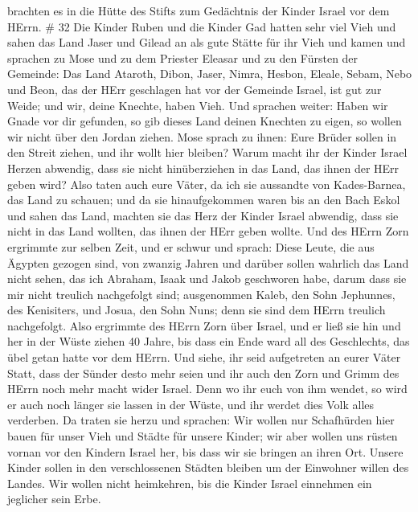 brachten es in die Hütte des Stifts zum Gedächtnis der Kinder Israel vor
dem HErrn. \# 32  Die Kinder Ruben und die Kinder Gad hatten
sehr viel Vieh und sahen das Land Jaser und Gilead an als gute Stätte
für ihr Vieh  und kamen und sprachen zu Mose und zu dem
Priester Eleasar und zu den Fürsten der Gemeinde:  Das Land
Ataroth, Dibon, Jaser, Nimra, Hesbon, Eleale, Sebam, Nebo und Beon,
 das der HErr geschlagen hat vor der Gemeinde Israel, ist
gut zur Weide; und wir, deine Knechte, haben Vieh.  Und
sprachen weiter: Haben wir Gnade vor dir gefunden, so gib dieses Land
deinen Knechten zu eigen, so wollen wir nicht über den Jordan ziehen.
 Mose sprach zu ihnen: Eure Brüder sollen in den Streit
ziehen, und ihr wollt hier bleiben?  Warum macht ihr der
Kinder Israel Herzen abwendig, dass sie nicht hinüberziehen in das Land,
das ihnen der HErr geben wird?  Also taten auch eure Väter,
da ich sie aussandte von Kades-Barnea, das Land zu schauen; 
und da sie hinaufgekommen waren bis an den Bach Eskol und sahen das
Land, machten sie das Herz der Kinder Israel abwendig, dass sie nicht in
das Land wollten, das ihnen der HErr geben wollte.  Und des
HErrn Zorn ergrimmte zur selben Zeit, und er schwur und sprach:
 Diese Leute, die aus Ägypten gezogen sind, von zwanzig
Jahren und darüber sollen wahrlich das Land nicht sehen, das ich
Abraham, Isaak und Jakob geschworen habe, darum dass sie mir nicht
treulich nachgefolgt sind;  ausgenommen Kaleb, den Sohn
Jephunnes, des Kenisiters, und Josua, den Sohn Nuns; denn sie sind dem
HErrn treulich nachgefolgt.  Also ergrimmte des HErrn Zorn
über Israel, und er ließ sie hin und her in der Wüste ziehen 40 Jahre,
bis dass ein Ende ward all des Geschlechts, das übel getan hatte vor dem
HErrn.  Und siehe, ihr seid aufgetreten an eurer Väter
Statt, dass der Sünder desto mehr seien und ihr auch den Zorn und Grimm
des HErrn noch mehr macht wider Israel.  Denn wo ihr euch
von ihm wendet, so wird er auch noch länger sie lassen in der Wüste, und
ihr werdet dies Volk alles verderben.  Da traten sie herzu
und sprachen: Wir wollen nur Schafhürden hier bauen für unser Vieh und
Städte für unsere Kinder;  wir aber wollen uns rüsten
vornan vor den Kindern Israel her, bis dass wir sie bringen an ihren
Ort. Unsere Kinder sollen in den verschlossenen Städten bleiben um der
Einwohner willen des Landes.  Wir wollen nicht heimkehren,
bis die Kinder Israel einnehmen ein jeglicher sein Erbe. 
